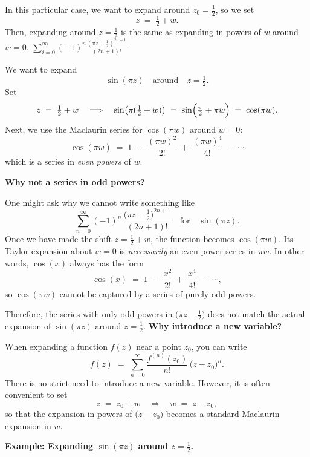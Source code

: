 \documentclass[12pt]{article}
\theoremstyle{definition} %
\theoremstyle{plain} %
\begin{document}
In this particular case, we want to expand around $z_0 = \tfrac12$, so we set
\[
   z \;=\; \tfrac12 + w.
\]
Then, expanding around $z = \tfrac12$ is the same as expanding in powers of $w$ around $w = 0$.
$\sum_{i=0}^{\infty} (-1)^{n}\frac{(\pi z-\frac{1}{2})^{{2n+1}}}{(2n+1)!}$


We want to expand 
\[
   \sin(\pi z)
   \quad
   \text{around}
   \quad
   z = \tfrac12.
\]
Set
\[
   z 
   \;=\; 
   \tfrac12 + w
   \quad\Longrightarrow\quad
   \sin\bigl(\pi (\tfrac12 + w)\bigr)
   \;=\;
   \sin\Bigl(\tfrac{\pi}{2} + \pi w\Bigr)
   \;=\;
   \cos(\pi w).
\]
Next, we use the Maclaurin series for $\cos(\pi w)$ around $w=0$:
\[
   \cos(\pi w)
   \;=\;
   1
   \;-\;
   \frac{(\pi w)^2}{2!}
   \;+\;
   \frac{(\pi w)^4}{4!}
   \;-\;
   \cdots
\]
which is a series in \emph{even powers} of $w$.

\bigskip

\noindent
\textbf{Why not a series in odd powers?}

\smallskip

One might ask why we cannot write something like
\[
   \sum_{n=0}^{\infty} (-1)^n 
   \,\frac{\bigl(\pi z-\tfrac{1}{2}\bigr)^{2n+1}}{(2n+1)!}
   \quad
   \text{for}
   \quad
   \sin(\pi z).
\]
Once we have made the shift $z = \tfrac12 + w$, the function becomes $\cos(\pi w)$. Its Taylor expansion about $w=0$ is \emph{necessarily} an even-power series in $\pi w$. In other words, $\cos(x)$ always has the form
\[
   \cos(x) 
   \;=\; 
   1 
   \;-\; 
   \frac{x^2}{2!}
   \;+\; 
   \frac{x^4}{4!}
   \;-\; 
   \cdots,
\]
so $\cos(\pi w)$ cannot be captured by a series of purely odd powers.

Therefore, the series with only odd powers in $\bigl(\pi z - \tfrac{1}{2}\bigr)$ does not match the actual expansion of $\sin(\pi z)$ around $z = \tfrac12$. 
\textbf{Why introduce a new variable?}

When expanding a function $f(z)$ near a point $z_0$, you can write
\[
   f(z)
   \;=\;
   \sum_{n=0}^\infty
   \frac{f^{(n)}(z_0)}{n!}
   \,\bigl(z - z_0\bigr)^n.
\]
There is no strict need to introduce a new variable. However, it is often convenient to set
\[
   z
   \;=\;
   z_0 + w
   \quad
   \Longrightarrow
   \quad
   w
   \;=\;
   z - z_0,
\]
so that the expansion in powers of $\bigl(z - z_0\bigr)$ becomes a standard Maclaurin expansion in $w$.

\medskip

\noindent
\textbf{Example: Expanding $\sin(\pi z)$ around $z = \tfrac12$.}
\end{document}
